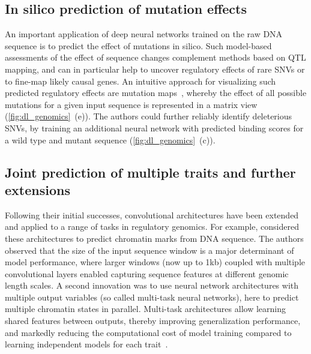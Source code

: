 \subsection{In silico prediction of mutation effects}
An important application of deep neural networks trained on the raw DNA sequence is to predict the effect of mutations in silico. Such model-based assessments of the effect of sequence changes complement methods based on QTL mapping, and can in particular help to uncover regulatory effects of rare SNVs or to fine-map likely causal genes. An intuitive approach for visualizing such predicted regulatory effects are mutation maps~\citep{alipanahi_predicting_2015}, whereby the effect of all possible mutations for a given input sequence is represented in a matrix view (\autoref{fig:dl_genomics}~(e)). The authors could further reliably identify deleterious SNVs, by training an additional neural network with predicted binding scores for a wild type and mutant sequence (\autoref{fig:dl_genomics}~(c)).

\subsection{Joint prediction of multiple traits and further extensions}
Following their initial successes, convolutional architectures have been extended and applied to a range of tasks in regulatory genomics. For example, \citet{zhou_predicting_2015} considered these architectures to predict chromatin marks from DNA sequence. The authors observed that the size of the input sequence window is a major determinant of model performance, where larger windows (now up to 1kb) coupled with multiple  convolutional layers enabled capturing sequence features at different genomic length scales. A second innovation was to use neural network architectures with multiple output variables (so called multi-task neural networks), here to predict multiple chromatin states in parallel. Multi-task architectures allow learning shared features between outputs, thereby improving generalization performance, and markedly reducing the computational cost of model training compared to learning independent models for each trait~\citep{dahl_multi-task_2014}.

